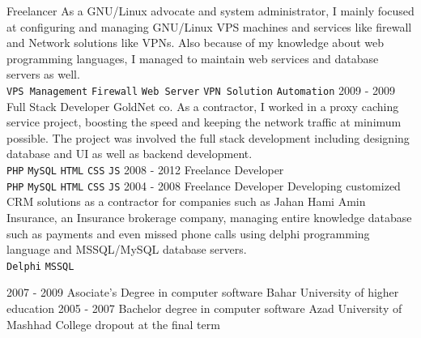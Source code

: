 \documentclass[12pt]{developercv}
\begin{document}
\begin{entrylist}
		{Freelancer}
		{
		As a GNU/Linux advocate and system administrator, I mainly focused at
		configuring and managing GNU/Linux VPS machines and services like firewall
		and Network solutions like VPNs. Also because of my knowledge about web
		programming languages, I managed to maintain web services and database
		servers as well.
		\\
		\texttt{VPS Management}\slashsep
		\texttt{Firewall}\slashsep
		\texttt{Web Server}\slashsep
		\texttt{VPN Solution}\slashsep
		\texttt{Automation}
		}
	\entry
		{2009 - 2009}
		{Full Stack Developer}
		{GoldNet co.}
		{
		As a contractor, I worked in a proxy caching service project, boosting the
		speed and keeping the network traffic at minimum possible. The project was
		involved the full stack development including designing database and UI
		as well as backend development.
		\\
		\texttt{PHP}\slashsep
		\texttt{MySQL}\slashsep
		\texttt{HTML}\slashsep
		\texttt{CSS}\slashsep
		\texttt{JS}
		}
	\entry
		{2008 - 2012}
		{Freelance Developer}
		{}
		{
		\\
		\texttt{PHP}\slashsep
		\texttt{MySQL}\slashsep
		\texttt{HTML}\slashsep
		\texttt{CSS}\slashsep
		\texttt{JS}
		}
	\entry
		{2004 - 2008}
		{Freelance Developer}
		{}
		{
		Developing customized CRM solutions as a contractor for companies
		such as Jahan Hami Amin Insurance, an Insurance brokerage company,
		managing entire knowledge database such as payments and even missed
		phone calls using delphi programming language and MSSQL/MySQL database
		servers.
		\\
		\texttt{Delphi}\slashsep
		\texttt{MSSQL}
		}
\end{entrylist}



\begin{entrylist}
	\entry
		{2007 - 2009}
		{Asociate's Degree in computer software}
		{Bahar University of higher education}
		{}
	\entry
		{2005 - 2007}
		{Bachelor degree in computer software}
		{Azad University of Mashhad}
		{College dropout at the final term}
\end{entrylist}

\end{document}
